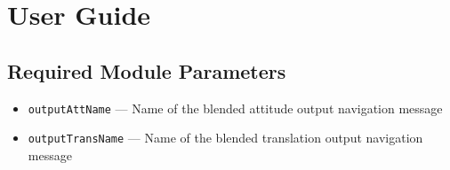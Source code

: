 
\section{User Guide}
\subsection{Required Module Parameters}
\begin{itemize}
	\item {\tt outputAttName} --- Name of the blended attitude output navigation message 
	\item {\tt outputTransName} --- Name of the blended translation output navigation message 
\end{itemize}


